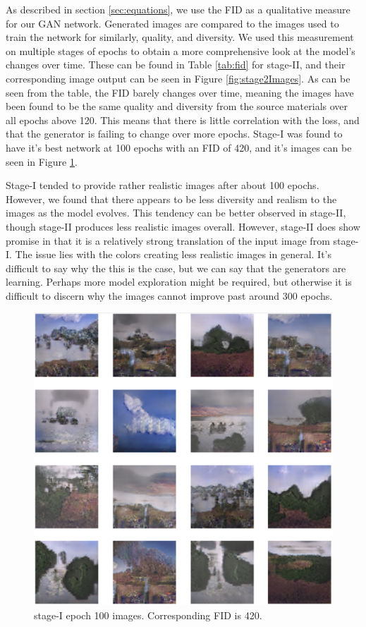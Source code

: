 \documentclass{article}
\begin{document}
	As described in section \ref{sec:equations}, we use the FID as a qualitative measure for our GAN network. Generated images are compared to the images used to train the network for similarly, quality, and diversity. We used this measurement on multiple stages of epochs to obtain a more comprehensive look at the model’s changes over time. These can be found in Table \ref{tab:fid} for stage-II, and their corresponding image output can be seen in Figure \ref{fig:stage2Images}. As can be seen from the table, the FID barely changes over time, meaning the images have been found to be the same quality and diversity from the source materials over all epochs above 120. This means that there is little correlation with the loss, and that the generator is failing to change over more epochs. Stage-I was found to have it's best network at 100 epochs with an FID of 420, and it's images can be seen in Figure \ref{fig:stage1Images}.

	Stage-I tended to provide rather realistic images after about 100 epochs. However, we found that there appears to be less diversity and realism to the images as the model evolves. This tendency can be better observed in stage-II, though stage-II produces less realistic images overall. However, stage-II does show promise in that it is a relatively strong translation of the input image from stage-I. The issue lies with the colors creating less realistic images in general. It's difficult to say why the this is the case, but we can say that the generators are learning. Perhaps more model exploration might be required, but otherwise it is difficult to discern why the images cannot improve past around 300 epochs.
	
	\begin{figure}[h]
	\centering
	\includegraphics[scale=0.4]{images/StageI_epoch100_FID420.png}
	\caption{stage-I epoch 100 images. Corresponding FID is 420.}
	\label{fig:stage1Images}
	\end{figure}
\end{document}
